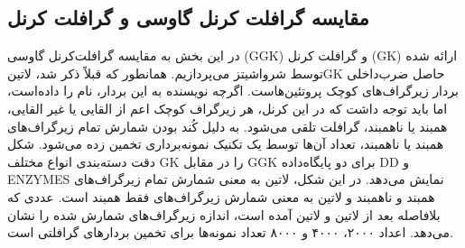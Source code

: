 \subsection{مقایسه گرافلت کرنل گاوسی و گرافلت کرنل}
در این بخش به مقایسه گرافلت‌کرنل گاوسی (GGK) و گرافلت کرنل (GK) ارائه شده توسط شرواشیتز می‌پردازیم. همانطور که قبلاً ذکر شد، ‌لاتین{GK} حاصل ضرب‌داخلی بردار زیرگراف‌های کوچک پروتئین‌هاست. اگرچه نویسنده به این بردار، نام  را داده‌است، اما باید توجه داشت که در این کرنل، هر زیرگراف کوچک اعم از القایی یا غیر القایی، همبند یا ناهمبند، گرافلت تلقی می‌شود. به دلیل کُند بودن شمارش تمام زیرگراف‌های همبند یا ناهمبند، تعداد آن‌ها توسط یک تکنیک نمونه‌برداری تخمین زده می‌شود. شکل  دقت دسته‌بندی انواع مختلف GK را در مقابل GGK برای دو پایگاه‌داده DD و ENZYMES نمایش می‌دهد. در این شکل، ‌لاتین{} به معنی شمارش تمام زیرگراف‌های همبند و ناهمبند و ‌لاتین{} به معنی شمارش زیرگراف‌های فقط همبند است. عددی که بلافاصله بعد از ‌لاتین{} و ‌لاتین{} آمده است، اندازه زیرگراف‌های شمارش شده را نشان می‌دهد. اعداد ۲۰۰۰، ۴۰۰۰ و ۸۰۰۰ تعداد نمونه‌ها برای تخمین بردارهای گرافلتی است.

